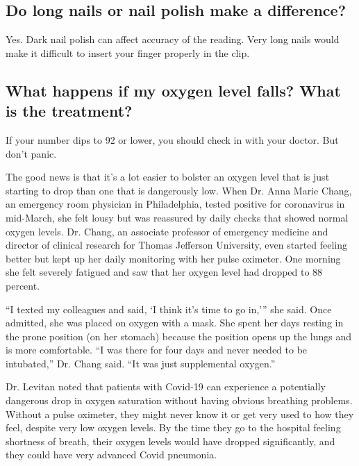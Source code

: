 \hypertarget{do-long-nails-or-nail-polish-make-a-difference}{%
\subsection{Do long nails or nail polish make a
difference?}\label{do-long-nails-or-nail-polish-make-a-difference}}

Yes. Dark nail polish can affect accuracy of the reading. Very long
nails would make it difficult to insert your finger properly in the
clip.

\hypertarget{what-happens-if-my-oxygen-level-falls-what-is-the-treatment}{%
\subsection{What happens if my oxygen level falls? What is the
treatment?}\label{what-happens-if-my-oxygen-level-falls-what-is-the-treatment}}

If your number dips to 92 or lower, you should check in with your
doctor. But don't panic.

The good news is that it's a lot easier to bolster an oxygen level that
is just starting to drop than one that is dangerously low. When Dr. Anna
Marie Chang, an emergency room physician in Philadelphia, tested
positive for coronavirus in mid-March, she felt lousy but was reassured
by daily checks that showed normal oxygen levels. Dr. Chang, an
associate professor of emergency medicine and director of clinical
research for Thomas Jefferson University, even started feeling better
but kept up her daily monitoring with her pulse oximeter. One morning
she felt severely fatigued and saw that her oxygen level had dropped to
88 percent.

``I texted my colleagues and said, `I think it's time to go in,''' she
said. Once admitted, she was placed on oxygen with a mask. She spent her
days resting in the prone position (on her stomach) because the position
opens up the lungs and is more comfortable. ``I was there for four days
and never needed to be intubated,'' Dr. Chang said. ``It was just
supplemental oxygen.''

Dr. Levitan noted that patients with Covid-19 can experience a
potentially dangerous drop in oxygen saturation without having obvious
breathing problems. Without a pulse oximeter, they might never know it
or get very used to how they feel, despite very low oxygen levels. By
the time they go to the hospital feeling shortness of breath, their
oxygen levels would have dropped significantly, and they could have very
advanced Covid pneumonia.

